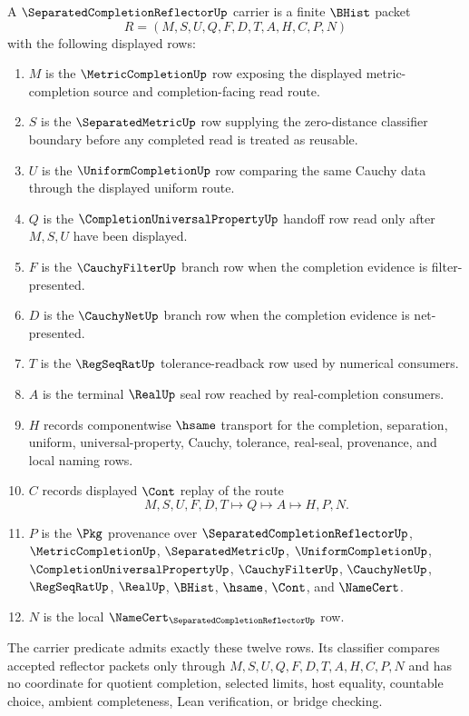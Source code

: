 \begin{definition}
\label{def:separated-completion-reflector-carrier}
A $\SeparatedCompletionReflectorUp$ carrier is a finite $\BHist$ packet
$$
R=(M,S,U,Q,F,D,T,A,H,C,P,N)
$$
with the following displayed rows:
\begin{enumerate}
\item $M$ is the $\MetricCompletionUp$ row exposing the displayed metric-completion source and completion-facing read route.
\item $S$ is the $\SeparatedMetricUp$ row supplying the zero-distance classifier boundary before any completed read is treated as reusable.
\item $U$ is the $\UniformCompletionUp$ row comparing the same Cauchy data through the displayed uniform route.
\item $Q$ is the $\CompletionUniversalPropertyUp$ handoff row read only after $M,S,U$ have been displayed.
\item $F$ is the $\CauchyFilterUp$ branch row when the completion evidence is filter-presented.
\item $D$ is the $\CauchyNetUp$ branch row when the completion evidence is net-presented.
\item $T$ is the $\RegSeqRatUp$ tolerance-readback row used by numerical consumers.
\item $A$ is the terminal $\RealUp$ seal row reached by real-completion consumers.
\item $H$ records componentwise $\hsame$ transport for the completion, separation, uniform, universal-property, Cauchy, tolerance, real-seal, provenance, and local naming rows.
\item $C$ records displayed $\Cont$ replay of the route
$$
M,S,U,F,D,T \longmapsto Q \longmapsto A \longmapsto H,P,N .
$$
\item $P$ is the $\Pkg$ provenance over $\SeparatedCompletionReflectorUp$, $\MetricCompletionUp$, $\SeparatedMetricUp$, $\UniformCompletionUp$, $\CompletionUniversalPropertyUp$, $\CauchyFilterUp$, $\CauchyNetUp$, $\RegSeqRatUp$, $\RealUp$, $\BHist$, $\hsame$, $\Cont$, and $\NameCert$.
\item $N$ is the local $\NameCert_{\SeparatedCompletionReflectorUp}$ row.
\end{enumerate}
The carrier predicate admits exactly these twelve rows. Its classifier compares accepted reflector packets only through $M,S,U,Q,F,D,T,A,H,C,P,N$ and has no coordinate for quotient completion, selected limits, host equality, countable choice, ambient completeness, Lean verification, or bridge checking.
\end{definition}

